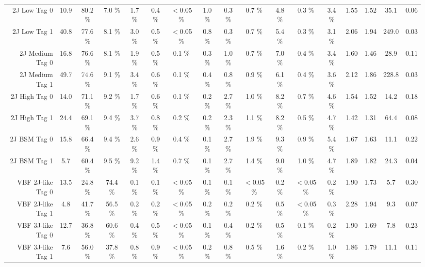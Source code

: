 \begin{tabular}{ r | c | c | c  | c | c |  c |  c |  c |  c |  c |  c |  c |  c |  c |  c |  c }
 2J Low Tag 0 &  10.9  &  80.2 \%  &  7.0 \%  &  1.7 \%  &  0.4 \%  &  $<$0.05 \%  &  1.0 \%  &  0.3 \%  &  0.7 \%  &  4.8 \%  &  0.3 \%  &  3.4 \%  & 1.55 & 1.52 & 35.1 & 0.06 \\
 2J Low Tag 1 &  40.8  &  77.6 \%  &  8.1 \%  &  3.0 \%  &  0.5 \%  &  $<$0.05 \%  &  0.8 \%  &  0.3 \%  &  0.7 \%  &  5.4 \%  &  0.3 \%  &  3.1 \%  & 2.06 & 1.94 & 249.0 & 0.03 \\
 2J Medium Tag 0 &  16.8  &  76.6 \%  &  8.1 \%  &  1.9 \%  &  0.5 \%  &  0.1 \%  &  0.3 \%  &  1.0 \%  &  0.7 \%  &  7.0 \%  &  0.4 \%  &  3.4 \%  & 1.60 & 1.46 & 28.9 & 0.11 \\
 2J Medium Tag 1 &  49.7  &  74.6 \%  &  9.1 \%  &  3.4 \%  &  0.6 \%  &  0.1 \%  &  0.4 \%  &  0.8 \%  &  0.9 \%  &  6.1 \%  &  0.4 \%  &  3.6 \%  & 2.12 & 1.86 & 228.8 & 0.03 \\
 2J High Tag 0 &  14.0  &  71.1 \%  &  9.2 \%  &  1.7 \%  &  0.6 \%  &  0.1 \%  &  0.2 \%  &  2.7 \%  &  1.0 \%  &  8.2 \%  &  0.7 \%  &  4.6 \%  & 1.54 & 1.52 & 14.2 & 0.18 \\
 2J High Tag 1 &  24.4  &  69.1 \%  &  9.4 \%  &  3.7 \%  &  0.8 \%  &  0.2 \%  &  0.2 \%  &  2.3 \%  &  1.1 \%  &  8.2 \%  &  0.5 \%  &  4.7 \%  & 1.42 & 1.31 & 64.4 & 0.08 \\
 2J BSM Tag 0 &  15.8  &  66.4 \%  &  9.4 \%  &  2.6 \%  &  0.9 \%  &  0.4 \%  &  0.1 \%  &  2.7 \%  &  1.9 \%  &  9.3 \%  &  0.9 \%  &  5.4 \%  & 1.67 & 1.63 & 11.1 & 0.22 \\
 2J BSM Tag 1 &  5.7  &  60.4 \%  &  9.5 \%  &  9.2 \%  &  1.4 \%  &  0.7 \%  &  0.1 \%  &  2.7 \%  &  1.4 \%  &  9.0 \%  &  1.0 \%  &  4.7 \%  & 1.89 & 1.82 & 24.3 & 0.04 \\
 VBF 2J-like Tag 0 &  13.5  &  24.8 \%  &  74.4 \%  &  0.1 \%  &  0.1 \%  &  $<$0.05 \%  &  0.1 \%  &  0.1 \%  &  $<$0.05 \%  &  0.2 \%  &  $<$0.05 \%  &  0.2 \%  & 1.90 & 1.73 & 5.7 & 0.30 \\
 VBF 2J-like Tag 1 &  4.8  &  41.7 \%  &  56.5 \%  &  0.2 \%  &  0.2 \%  &  $<$0.05 \%  &  0.2 \%  &  0.2 \%  &  0.2 \%  &  0.5 \%  &  $<$0.05 \%  &  0.3 \%  & 2.28 & 1.94 & 9.3 & 0.07 \\
 VBF 3J-like Tag 0 &  12.7  &  36.8 \%  &  60.6 \%  &  0.4 \%  &  0.5 \%  &  $<$0.05 \%  &  0.1 \%  &  0.4 \%  &  0.2 \%  &  0.5 \%  &  0.1 \%  &  0.2 \%  & 1.90 & 1.69 & 7.8 & 0.23 \\
 VBF 3J-like Tag 1 &  7.6  &  56.0 \%  &  37.8 \%  &  0.8 \%  &  0.9 \%  &  $<$0.05 \%  &  0.2 \%  &  0.8 \%  &  0.5 \%  &  1.6 \%  &  0.2 \%  &  1.0 \%  & 1.86 & 1.79 & 11.1 & 0.11 \\

\end{tabular}
